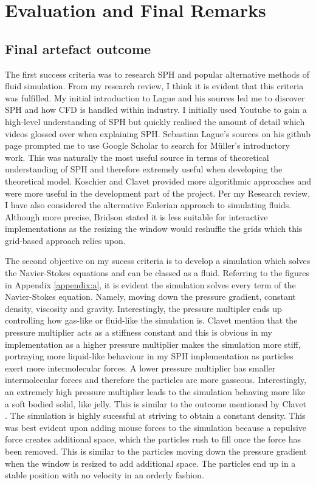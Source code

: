 \documentclass[write-up.tex]{subfiles}
\begin{document}
 \section{Evaluation and Final Remarks}
 \subsection{Final artefact outcome}
The first success criteria was to research SPH and popular alternative methods of fluid simulation. From my research review, I think it is evident that this criteria was fulfilled. My initial introduction to Lague \cite{Lague} and his sources led me to discover SPH and how CFD is handled within industry. I initially used Youtube to gain a high-level understanding of SPH but quickly realised the amount of detail which videos glossed over when explaining SPH. Sebastian Lague's sources on his github page prompted me to use Google Scholar to search for Müller's \cite{muller} introductory work. This was naturally the most useful source in terms of theoretical understanding of SPH and therefore extremely useful when developing the theoretical model. Koschier \cite{koschier} and Clavet \cite{clavet} provided more algorithmic approaches and were more useful in the development part of the project. Per my Research review, I have also considered the alternative Eulerian approach to simulating fluids. Although more precise, Bridson \cite{bridson} stated it is less suitable for interactive implementations as the resizing the window would reshuffle the grids which this grid-based approach relies upon.

The second objective on my sucess criteria is to develop a simulation which solves the Navier-Stokes equations and can be classed as a fluid. Referring to the figures in  Appendix \ref{appendix:a}, it is evident the simulation solves every term of the Navier-Stokes equation. Namely, moving down the pressure gradient, constant density, viscosity and gravity. Interestingly, the pressure multipler ends up controlling how gas-like or fluid-like the simulation is. Clavet \cite{clavet} mention that the pressure multiplier acts as a stiffness constant and this is obvious in my implementation as a higher pressure multiplier makes the simulation more stiff, portraying more liquid-like behaviour in my SPH implementation as particles exert more intermolecular forces. A lower pressure multiplier has smaller intermolecular forces and therefore the particles are more gasseous. Interestingly, an extremely high pressure multiplier leads to the simulation behaving more like a soft bodied solid, like jelly. This is similar to the outcome mentioned by Clavet \cite{clavet}. The simulation is highly sucessful at striving to obtain a constant density. This was best evident upon adding mouse forces to the simulation because a repulsive force creates additional space, which the particles rush to fill once the force has been removed. This is similar to the particles moving down the pressure gradient when the window is resized to add additional space. The particles end up in a stable position with no velocity in an orderly fashion.
\end{document}

